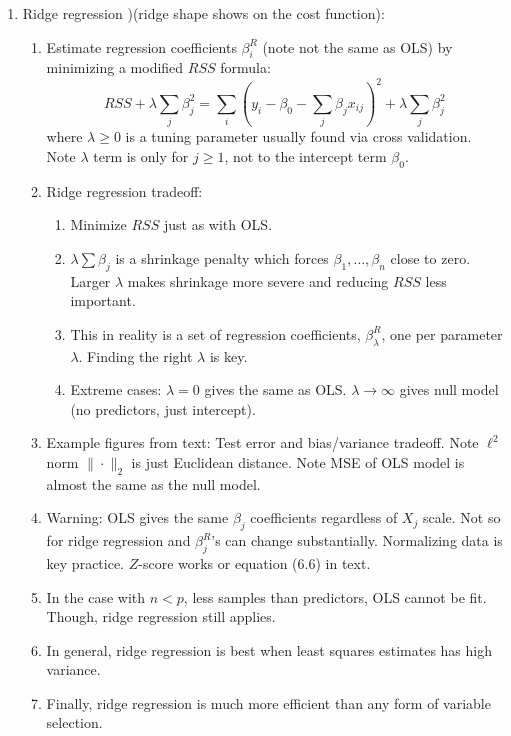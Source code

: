 \documentclass{article}
\begin{document}
\begin{enumerate}
\item Ridge regression )(ridge shape shows on the cost function):
\begin{enumerate}
\item Estimate regression coefficients $\beta^R_i$ (note not the same as OLS) by minimizing a modified $RSS$ formula:
\[
RSS + \lambda \sum_j \beta_j^2
= \sum_i \left( y_i - \beta_0 - \sum_j \beta_j x_{ij} \right)^2  + \lambda \sum_j \beta_j^2
\]
where $\lambda \geq 0$ is a tuning parameter usually found via cross validation. Note $\lambda$ term is only for $j \geq 1$, not to the intercept term $\beta_0$.

\item Ridge regression tradeoff:
\begin{enumerate}
\item Minimize $RSS$ just as with OLS.
\item $\lambda \sum \beta_j$ is a shrinkage penalty which forces $\beta_1, \dots , \beta_n$ close to zero. Larger $\lambda$ makes shrinkage more severe and reducing $RSS$ less important.
\item This in reality is a set of regression coefficients, $\beta_{\lambda}^R$, one per parameter $\lambda$. Finding the right $\lambda$ is key.
\item Extreme cases: $\lambda=0$ gives the same as OLS. $\lambda \rightarrow \infty$ gives null model (no predictors, just intercept).
\end{enumerate}

\item Example figures from text: Test error and bias/variance tradeoff. Note $\ell^2$ norm $\| \cdot \|_2$ is just Euclidean distance. Note MSE of OLS model is almost the same as the null model.
\item Warning: OLS gives the same $\beta_j$ coefficients regardless of $X_j$ scale. Not so for ridge regression and $\beta_j^R$'s can change substantially. Normalizing data is key practice. $Z$-score works or equation (6.6) in text.
\item In the case with $n < p$, less samples than predictors, OLS cannot be fit. Though, ridge regression still applies.
\item In general, ridge regression is best when least squares estimates has high variance.
\item Finally, ridge regression is much more efficient than any form of variable selection.
\end{enumerate}


\end{enumerate}
\end{document}
